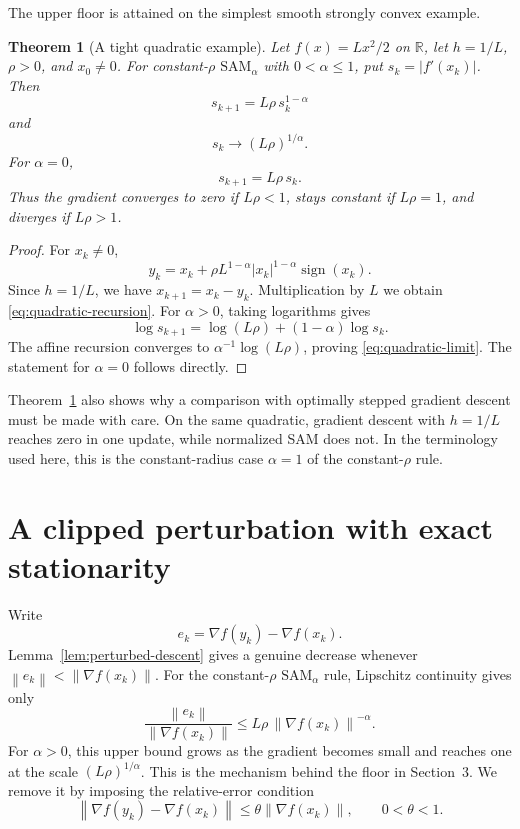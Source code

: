 \documentclass[11pt]{article}
\newtheorem{theorem}{Theorem}
\theoremstyle{remark}
\newcommand{\R}{\mathbb{R}}
\newcommand{\norm}[1]{\left\lVert #1\right\rVert}
\newcommand{\SAMa}{\mathrm{SAM}_{\alpha}}
\begin{document}
The upper floor is attained on the simplest smooth strongly convex example.

\begin{theorem}[A tight quadratic example]\label{thm:quadratic}
Let $f(x)=Lx^2/2$ on $\R$, let $h=1/L$, $\rho>0$, and $x_0\neq0$.
For constant-$\rho$ $\SAMa$ with $0<\alpha\leq1$, put
$s_k=|f'(x_k)|$.  Then
\begin{equation}\label{eq:quadratic-recursion}
  s_{k+1}=L\rho\,s_k^{1-\alpha}
\end{equation}
and
\begin{equation}\label{eq:quadratic-limit}
  s_k\longrightarrow(L\rho)^{1/\alpha}.
\end{equation}
  For $\alpha=0$,
$$
   s_{k+1}=L\rho\,s_k.
$$
Thus the gradient converges to zero if $L\rho<1$, stays constant if
$L\rho=1$, and diverges if $L\rho>1$.
\end{theorem}

\begin{proof}
For $x_k\neq0$,
$$
 y_k=x_k+\rho L^{1-\alpha}
       |x_k|^{1-\alpha}\operatorname{sign}(x_k).
$$
Since $h=1/L$, we have $x_{k+1}=x_k-y_k$.  Multiplication by $L$
we obtain \eqref{eq:quadratic-recursion}.
For $\alpha>0$, taking logarithms gives
$$
 \log s_{k+1}=\log(L\rho)+(1-\alpha)\log s_k.
$$
The affine recursion converges to
$\alpha^{-1}\log(L\rho)$, proving \eqref{eq:quadratic-limit}.
The statement for $\alpha=0$ follows directly.
\end{proof}

Theorem~\ref{thm:quadratic} also shows why a comparison with optimally
stepped gradient descent must be made with care.  On the same quadratic,
gradient descent with $h=1/L$ reaches zero in one update, while normalized
SAM does not.  In the terminology used here, this is the constant-radius case
$\alpha=1$ of the constant-$\rho$ rule.

\section{A clipped perturbation with exact stationarity}\label{sec4}

Write
$$
 e_k=\nabla f(y_k)-\nabla f(x_k).
$$
Lemma~\ref{lem:perturbed-descent} gives a genuine decrease whenever
$\norm{e_k}<\norm{\nabla f(x_k)}$.  For the constant-$\rho$
$\SAMa$ rule, Lipschitz continuity gives only
$$
 \frac{\norm{e_k}}{\norm{\nabla f(x_k)}}
 \leq L\rho\,\norm{\nabla f(x_k)}^{-\alpha}.
$$
For $\alpha>0$, this upper bound grows as the gradient becomes small and
reaches one at the scale $(L\rho)^{1/\alpha}$.  This is the mechanism
behind the floor in Section~3.  We remove it by imposing the relative-error
condition
\begin{equation}\label{eq:relative-error}
 \norm{\nabla f(y_k)-\nabla f(x_k)}
 \leq\theta\norm{\nabla f(x_k)},
 \qquad 0<\theta<1.
\end{equation}
\end{document}
